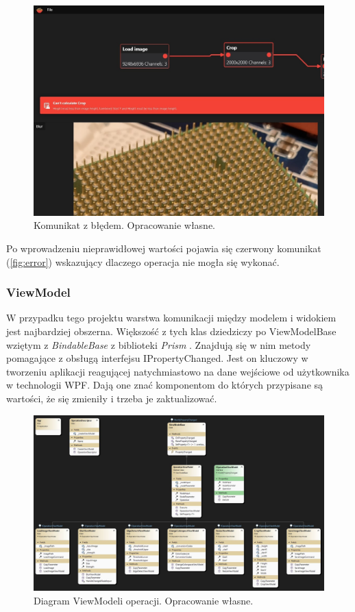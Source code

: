 \begin{figure}[H]
    \centering
    \includegraphics[width=0.8\linewidth]{images/Picture31.jpg}
    \caption{Komunikat z błędem. Opracowanie własne.}
    \label{fig:error}
\end{figure}

Po wprowadzeniu nieprawidłowej wartości pojawia się czerwony komunikat (\autoref{fig:error}) wskazujący dlaczego operacja nie mogła się wykonać.

\subsubsection{ViewModel}

W przypadku tego projektu warstwa komunikacji między modelem i widokiem jest najbardziej obszerna. 
Większość z tych klas dziedziczy po ViewModelBase wziętym z \textit{BindableBase} \cite{prismlibraryprism} z biblioteki \textit{Prism} \cite{prismlibrary}. 
Znajdują się w nim metody pomagające z obsługą interfejsu IPropertyChanged. 
Jest on kluczowy w tworzeniu aplikacji reagującej natychmiastowo na dane wejściowe od użytkownika w technologii WPF. 
Dają one znać komponentom do których przypisane są wartości, że się zmieniły i trzeba je zaktualizować.


\begin{figure}[H]
    \centering
    \includegraphics[width=1\linewidth]{images/Picture20.jpg}
    \caption{Diagram ViewModeli operacji. Opracowanie własne.}
    \label{fig:vmDiagOperation}
\end{figure}


